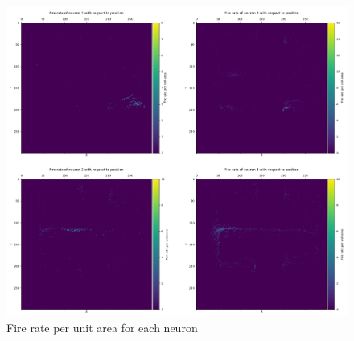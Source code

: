 \documentclass[12pt, a4paper]{article}
\begin{document}
\begin{figure}[H]
  \centering
  \includegraphics[width=\linewidth]{../figures/spatial_fire_rates}
  \caption{Fire rate per unit area for each neuron} \label{spatial_fire_rates}
\end{figure}


\bibdata
\end{document}
